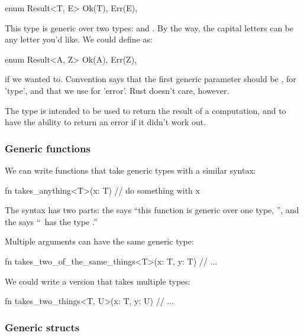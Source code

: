 \begin{rustc}
enum Result<T, E> {
    Ok(T),
    Err(E),
}
\end{rustc}

This type is generic over two types:  and . By the way, the capital letters can be any letter you'd like. We could define 
 as:

\begin{rustc}
enum Result<A, Z> {
    Ok(A),
    Err(Z),
}
\end{rustc}

if we wanted to. Convention says that the first generic parameter should be , for 'type', and that we use  for 'error'. Rust 
doesn't care, however.

\blank

The  type is intended to be used to return the result of a computation, and to have the ability to return an error if it 
didn't work out.

\subsubsection*{Generic functions}

We can write functions that take generic types with a similar syntax:

\begin{rustc}
fn takes_anything<T>(x: T) {
    // do something with x
}
\end{rustc}

The syntax has two parts: the  says \enquote{this function is generic over one type, }, and the  says 
\enquote{\x\ has the type .}

\blank

Multiple arguments can have the same generic type:

\begin{rustc}
fn takes_two_of_the_same_things<T>(x: T, y: T) {
    // ...
}
\end{rustc}

We could write a version that takes multiple types:

\begin{rustc}
fn takes_two_things<T, U>(x: T, y: U) {
    // ...
}
\end{rustc}

\subsubsection*{Generic structs}

